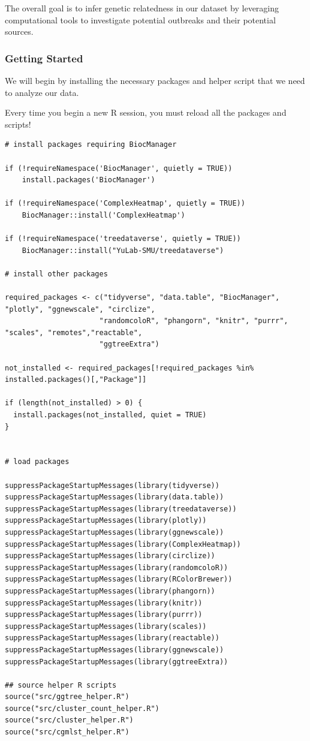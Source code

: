 \documentclass[
]{book}
\begin{document}
The overall goal is to infer genetic relatedness in our dataset by leveraging computational tools to investigate potential outbreaks and their potential sources.

\subsubsection{Getting Started}\label{getting-started}

We will begin by installing the necessary packages and helper script that we need to analyze our data.

Every time you begin a new R session, you must reload all the packages and scripts!

\begin{verbatim}
# install packages requiring BiocManager 

if (!requireNamespace('BiocManager', quietly = TRUE))
    install.packages('BiocManager')

if (!requireNamespace('ComplexHeatmap', quietly = TRUE))
    BiocManager::install('ComplexHeatmap')

if (!requireNamespace('treedataverse', quietly = TRUE))
    BiocManager::install("YuLab-SMU/treedataverse")

# install other packages

required_packages <- c("tidyverse", "data.table", "BiocManager", "plotly", "ggnewscale", "circlize",
                      "randomcoloR", "phangorn", "knitr", "purrr", "scales", "remotes","reactable",
                      "ggtreeExtra")

not_installed <- required_packages[!required_packages %in% installed.packages()[,"Package"]]

if (length(not_installed) > 0) {
  install.packages(not_installed, quiet = TRUE)
}


# load packages 

suppressPackageStartupMessages(library(tidyverse))
suppressPackageStartupMessages(library(data.table))
suppressPackageStartupMessages(library(treedataverse))
suppressPackageStartupMessages(library(plotly))
suppressPackageStartupMessages(library(ggnewscale))
suppressPackageStartupMessages(library(ComplexHeatmap))
suppressPackageStartupMessages(library(circlize))
suppressPackageStartupMessages(library(randomcoloR))
suppressPackageStartupMessages(library(RColorBrewer))
suppressPackageStartupMessages(library(phangorn))
suppressPackageStartupMessages(library(knitr))
suppressPackageStartupMessages(library(purrr))
suppressPackageStartupMessages(library(scales))
suppressPackageStartupMessages(library(reactable))
suppressPackageStartupMessages(library(ggnewscale))
suppressPackageStartupMessages(library(ggtreeExtra))

## source helper R scripts
source("src/ggtree_helper.R")
source("src/cluster_count_helper.R")
source("src/cluster_helper.R")
source("src/cgmlst_helper.R")
\end{verbatim}
\end{document}
